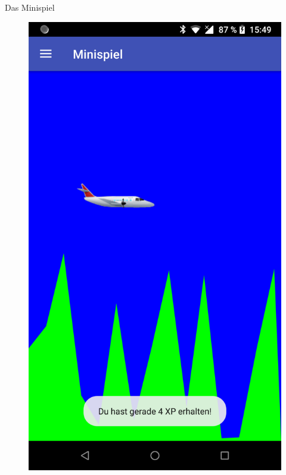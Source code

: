 \documentclass[final,20pt]{beamer}
\newlength{\colwidth}
\begin{document}
\begin{frame}[t]
\begin{columns}[t]
\begin{column}{\colwidth}
	\begin{alertblock}{Das Minispiel}
		\begin{figure}[H]
			\centering
			\includegraphics[width=0.6\colwidth]{pics/device-game}
		\end{figure}
	\end{alertblock}


\end{column}
\end{columns}
\end{frame}
\end{document}

